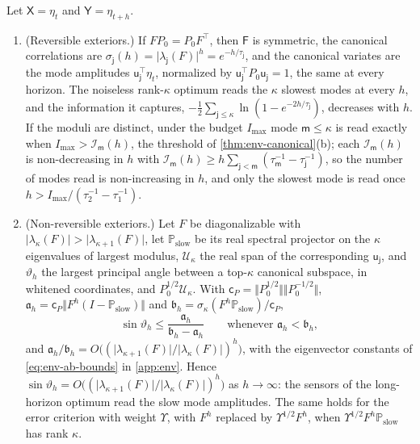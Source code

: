 \begin{proposition}\label{prop:env-horizon}
Let $\mathsf X=\eta_t$ and $\mathsf Y=\eta_{t+h}$.
\begin{enumerate}
\item[(a)] (Reversible exteriors.) If $FP_0=P_0F^\top$, then $\mathsf F$ is symmetric, the canonical correlations are $\sigma_{\mathsf j}(h)=\lvert\lambda_{\mathsf j}(F)\rvert^h=e^{-h/\tau_{\mathsf j}}$, and the canonical variates are the mode amplitudes $\mathsf u_{\mathsf j}^\top\eta_t$, normalized by $\mathsf u_{\mathsf j}^\top P_0\mathsf u_{\mathsf j}=1$, the same at every horizon. The noiseless rank-$\kappa$ optimum reads the $\kappa$ slowest modes at every $h$, and the information it captures, $-\frac12\sum_{\mathsf j\le\kappa}\ln(1-e^{-2h/\tau_{\mathsf j}})$, decreases with $h$. If the moduli are distinct, under the budget $I_{\max}$ mode $\mathsf m\le\kappa$ is read exactly when $I_{\max}>\mathcal I_{\mathsf m}(h)$, the threshold of \cref{thm:env-canonical}(b); each $\mathcal I_{\mathsf m}(h)$ is non-decreasing in $h$ with $\mathcal I_{\mathsf m}(h)\ge h\sum_{\mathsf j<\mathsf m}(\tau_{\mathsf m}^{-1}-\tau_{\mathsf j}^{-1})$, so the number of modes read is non-increasing in $h$, and only the slowest mode is read once $h>I_{\max}/(\tau_2^{-1}-\tau_1^{-1})$.
\item[(b)] (Non-reversible exteriors.) Let $F$ be diagonalizable with $\lvert\lambda_\kappa(F)\rvert>\lvert\lambda_{\kappa+1}(F)\rvert$, let $\mathbb P_{\mathrm{slow}}$ be its real spectral projector on the $\kappa$ eigenvalues of largest modulus, $\mathcal U_\kappa$ the real span of the corresponding $\mathsf u_{\mathsf j}$, and $\vartheta_h$ the largest principal angle between a top-$\kappa$ canonical subspace, in whitened coordinates, and $P_0^{1/2}\mathcal U_\kappa$. With $\mathsf c_P=\Vert P_0^{1/2}\Vert\Vert P_0^{-1/2}\Vert$, $\mathfrak a_h=\mathsf c_P\Vert F^h(I-\mathbb P_{\mathrm{slow}})\Vert$ and $\mathfrak b_h=\sigma_\kappa(F^h\mathbb P_{\mathrm{slow}})/\mathsf c_P$,
\[
\sin\vartheta_h\le\frac{\mathfrak a_h}{\mathfrak b_h-\mathfrak a_h}\qquad\text{whenever }\mathfrak a_h<\mathfrak b_h,
\]
and $\mathfrak a_h/\mathfrak b_h=O\bigl((\lvert\lambda_{\kappa+1}(F)\rvert/\lvert\lambda_\kappa(F)\rvert)^h\bigr)$, with the eigenvector constants of \eqref{eq:env-ab-bounds} in \cref{app:env}. Hence $\sin\vartheta_h=O\bigl((\lvert\lambda_{\kappa+1}(F)\rvert/\lvert\lambda_\kappa(F)\rvert)^h\bigr)$ as $h\to\infty$: the sensors of the long-horizon optimum read the slow mode amplitudes. The same holds for the error criterion with weight $\Upsilon$, with $F^h$ replaced by $\Upsilon^{1/2}F^h$, when $\Upsilon^{1/2}F^h\mathbb P_{\mathrm{slow}}$ has rank $\kappa$.

\end{enumerate}
\end{proposition}
